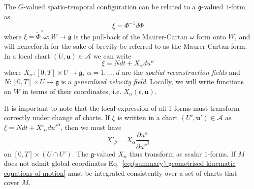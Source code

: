 The $G$-valued spatio-temporal configuration can be related to a $\mathfrak{g}$-valued $1$-form as
\begin{equation} \label{eq:(summary) Phi from xi}
\xi = \Phi^{-1} d \Phi
\end{equation}
where $\xi = \tilde{\Phi}^* \omega : W \to \mathfrak{g}$ is the pull-back of the Maurer-Cartan $\omega$ form onto $W$, and will henceforth for the sake of brevity be referred to as the Maurer-Cartan form. In a local chart $(U, \mathbf{u}) \in \mathcal{A}$ we can write
\begin{equation} \label{eq:xi in basis}
\xi = N dt + X_\alpha d u^\alpha
\end{equation}
where $X_\alpha : [0, T] \times U \to \mathfrak{g},\ \alpha = 1,\dots,d$ are the \textit{spatial reconstruction fields} and $N : [0, T] \times U \to \mathfrak{g}$ is a \textit{generalised velocity field}. Locally, we will write functions on $W$ in terms of their coordinates, i.e. $X_\alpha(t, \mathbf{u})$.

It is important to note that the local expression of all $1$-forms must transform correctly under change of charts. If $\xi$ is written in a chart $(U', \mathbf{u}') \in \mathcal{A}$ as $\xi = N dt + X'_\alpha du'^\alpha$, then we must have
\begin{equation} \label{eq:X transformation rule}
X'_\beta = X_\alpha \frac{\partial u^\alpha}{\partial u'^\beta}
\end{equation}
on $[0, T] \times (U \cap U')$. The $\mathfrak{g}$-valued $X_\alpha$ thus transform as scalar $1$-forms. If $M$ does not admit global coordinates Eq.~\ref{eq:(summary) geometrised kinematic equations of motion} must be integrated consistently over a set of charts that cover $M$.

